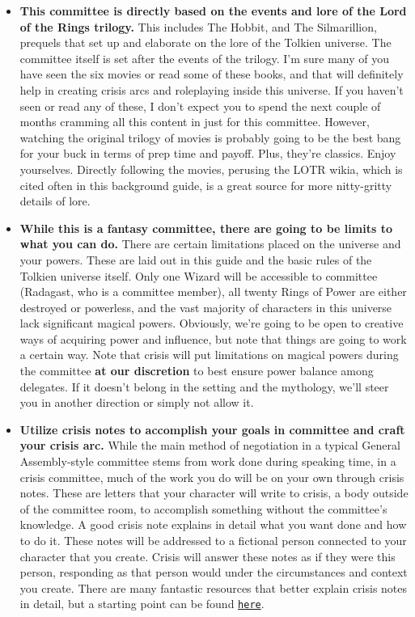 \documentclass[10pt, letterpaper]{article}
\begin{document}
        \begin{itemize}
            \item {\textbf{This committee is directly based on the events and lore of the Lord of the Rings trilogy.} This includes The Hobbit, and The Silmarillion, prequels that set up and elaborate on the lore of the Tolkien universe. The committee itself is set after the events of the trilogy. I’m sure many of you have seen the six movies or read some of these books, and that will definitely help in creating crisis arcs and roleplaying inside this universe. If you haven’t seen or read any of these, I don’t expect you to spend the next couple of months cramming all this content in just for this committee. However, watching the original trilogy of movies is probably going to be the best bang for your buck in terms of prep time and payoff. Plus, they’re classics. Enjoy yourselves. Directly following the movies, perusing the LOTR wikia, which is cited often in this background guide, is a great source for more nitty-gritty details of lore.}
            
            \item {\textbf{While this is a fantasy committee, there are going to be limits to what you can do.} There are certain limitations placed on the universe and your powers. These are laid out in this guide and the basic rules of the Tolkien universe itself. Only one Wizard will be accessible to committee (Radagast, who is a committee member), all twenty Rings of Power are either destroyed or powerless, and the vast majority of characters in this universe lack significant magical powers. Obviously, we’re going to be open to creative ways of acquiring power and influence, but note that things are going to work a certain way. Note that crisis will put limitations on magical powers during the committee \textbf{at our discretion} to best ensure power balance among delegates. If it doesn’t belong in the setting and the mythology, we’ll steer you in another direction or simply not allow it.}
            
            \item {\textbf{Utilize crisis notes to accomplish your goals in committee and craft your crisis arc.} While the main method of negotiation in a typical General Assembly-style committee stems from work done during speaking time, in a crisis committee, much of the work you do will be on your own through crisis notes. These are letters that your character will write to crisis, a body outside of the committee room, to accomplish something without the committee’s knowledge. A good crisis note explains in detail what you want done and how to do it. These notes will be addressed to a fictional person connected to your character that you create. Crisis will answer these notes as if they were this person, responding as that person would under the circumstances and context you create. There are many fantastic resources that better explain crisis notes in detail, but a starting point can be found \texttt{\href{http://bestdelegate.com/the-three-crisis-notes-to-send-at-the-beginning-of-any-model-un-crisis-committee/}{here}}.}
            

\end{itemize}
\end{document}
